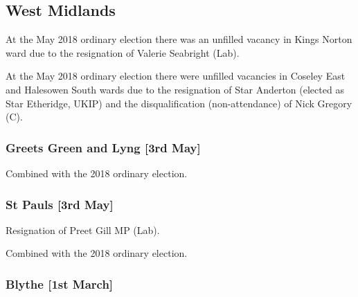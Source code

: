 \begin{resultsiii}
\section{West Midlands}


At the May 2018 ordinary election there was an unfilled vacancy in Kings Norton ward due to the resignation of Valerie Seabright (Lab).


At the May 2018 ordinary election there were unfilled vacancies in Coseley East and Halesowen South wards due to the resignation of Star Anderton (elected as Star Etheridge, UKIP) and the disqualification (non-attendance) of Nick Gregory (C).


\subsubsection*{Greets Green and Lyng \hspace*{\fill}\nolinebreak[1]%
\enspace\hspace*{\fill}
[3rd May]}



Combined with the 2018 ordinary election.

\subsubsection*{St Pauls \hspace*{\fill}\nolinebreak[1]%
\enspace\hspace*{\fill}
[3rd May]}


Resignation of Preet Gill MP (Lab).

Combined with the 2018 ordinary election.


\subsubsection*{Blythe \hspace*{\fill}\nolinebreak[1]%
\enspace\hspace*{\fill}
[1st March]}


\end{resultsiii}
